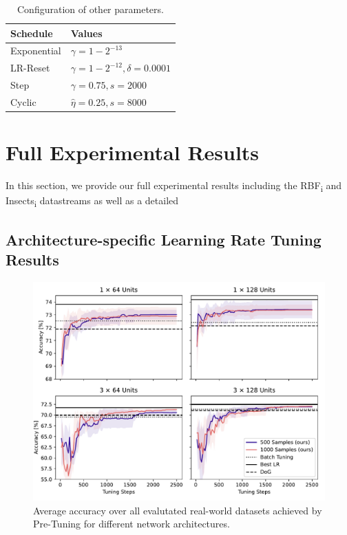 \documentclass{article} %
\begin{document}
\begin{table}[ht]
   \centering
   \caption{Configuration of other parameters.}
   \begin{tabular}{l l}
      \toprule
      Schedule    & Values                                  \\
      \midrule
      Exponential & $\gamma = 1 - 2^{-13}$                  \\
      LR-Reset    & $\gamma = 1 - 2^{-12}, \delta = 0.0001$ \\
      Step        & $\gamma = 0.75, s = 2000$               \\
      Cyclic      & $\hat{\eta} = 0.25, s = 8000$           \\
      \bottomrule
   \end{tabular}
\end{table}
\newpage
\section{Full Experimental Results}\label{app:full_results}

In this section, we provide our full experimental results including the RBF\textsubscript{i} and Insects\textsubscript{i} datastreams as well as a detailed

\subsection{Architecture-specific Learning Rate Tuning Results}\label{app:tuning_architectures}

\begin{figure}[h]
   \centering
   \includegraphics[width=\textwidth]{figures/pretune_architectures_exp_schedule.pdf}
   \caption{Average accuracy over all evalutated real-world datasets achieved by Pre-Tuning for different network architectures.}
\end{figure}
\end{document}
